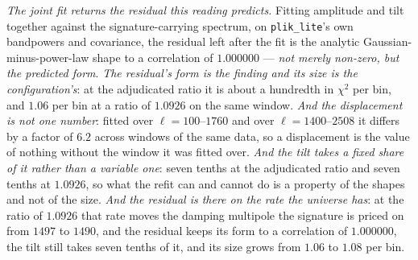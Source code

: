\documentclass[11pt,a4paper]{article}
\theoremstyle{plain}
\theoremstyle{definition}
\theoremstyle{remark}
\begin{document}
\emph{The joint fit returns the residual this reading
predicts.} Fitting amplitude and tilt together against the signature-carrying spectrum, on
\texttt{plik\_lite}'s own bandpowers and covariance, the residual left after the fit is the analytic
Gaussian-minus-power-law shape to a correlation of $1.000000$ --- \emph{not merely non-zero, but the
predicted form}. \emph{The residual's form is the finding and its size is the configuration's}: at the adjudicated ratio it is about a hundredth in $\chi^{2}$ per bin, and $1.06$ per bin at a ratio of $1.0926$ on the same window.
\emph{And the displacement is not one number}: fitted over $\ell=100$--$1760$ and over
$\ell=1400$--$2508$ it differs by a factor of $6.2$ across windows of the same data, so a
displacement is the value of nothing without the window it was fitted over. \emph{And the tilt takes a fixed share of it rather than a variable one}: seven tenths at the adjudicated ratio and seven tenths at $1.0926$, so what the refit can and cannot do is a
property of the shapes and not of the size. \emph{And the residual is there on the rate the universe has}: at the ratio of $1.0926$ that rate moves the damping multipole the signature is priced on from $1497$ to $1490$, and the residual keeps its form to a correlation of $1.000000$, the tilt still takes seven tenths of it, and its size grows from $1.06$ to $1.08$ per bin.
\end{document}

